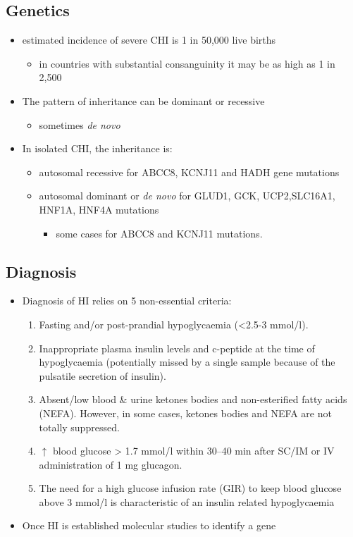 \documentclass{scrartcl}
\begin{document}
\subsection{Genetics}
\label{sec:orgb9e3810}
\begin{itemize}
\item estimated incidence of severe CHI is 1 in 50,000 live births
\begin{itemize}
\item in countries with substantial consanguinity it may be as high as 1 in 2,500
\end{itemize}
\item The pattern of inheritance can be dominant or recessive
\begin{itemize}
\item sometimes \emph{de novo}
\end{itemize}
\item In isolated CHI, the inheritance is:
\begin{itemize}
\item autosomal recessive for ABCC8, KCNJ11 and HADH gene mutations
\item autosomal dominant or \emph{de novo} for GLUD1, GCK, UCP2,SLC16A1, HNF1A, HNF4A mutations
\begin{itemize}
\item some cases for ABCC8 and KCNJ11 mutations.
\end{itemize}
\end{itemize}
\end{itemize}

\subsection{Diagnosis}
\label{sec:org482a349}
\begin{itemize}
\item Diagnosis of HI relies on 5 non-essential criteria:
\begin{enumerate}
\item Fasting and/or post-prandial hypoglycaemia (<2.5-3 mmol/l).
\item Inappropriate plasma insulin levels and c-peptide at the time of
hypoglycaemia (potentially missed by a single sample because of
the pulsatile secretion of insulin).
\item Absent/low blood \& urine ketones bodies and non-esterified fatty
acids (NEFA). However, in some cases, ketones bodies and NEFA are
not totally suppressed.
\item \(\uparrow\) blood glucose \textgreater{} 1.7 mmol/l within 30–40 min after
SC/IM or IV administration of 1 mg glucagon.
\item The need for a high glucose infusion rate (GIR) to keep blood
glucose above 3 mmol/l is characteristic of an insulin related
hypoglycaemia
\end{enumerate}

\item Once HI is established molecular studies to identify a gene
\end{itemize}
\end{document}
